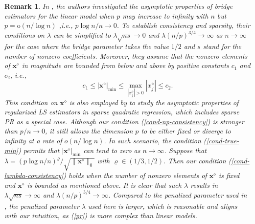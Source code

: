 \documentclass{article}
\newtheorem{remark}{Remark}
\numberwithin{equation}{section}
\begin{document}
\begin{remark}\label{explanation-con-lambda}  In \cite{huang2008asymptotic}, the authors investigated the asymptotic properties of bridge estimators for the linear model when
$p$ may increase to infinity with $n$ but $p=\mathrm{o}(n/\log n)$ ,i.e., $p\log n/n\to0$. To establish consistency and sparsity, their conditions on $\lambda$ can be simplified to $\lambda\sqrt{ns}\to0$ and $\lambda(n/p)^{3/4}\to\infty$ as $n\to\infty$ for the case where the bridge parameter takes the value $1/2$ and $s$ stand for the number of nonzero coefficients.
Moreover, they assume that the nonzero elements of $\mathbf{x}^\diamond$ in magnitude are bounded from below and above by positive constants $c_1$ and $c_2$, i.e.,
\begin{equation}\label{cond-mintrue2}
c_1\leq	|\mathbf{x}^\diamond|_{\mathrm{min}} \leq\max_{|x_j^\diamond|>0}|x_j^\diamond|\leq c_2.\nonumber
\end{equation}
This condition on $\mathbf{x}^\diamond$ is also employed  by \cite{fan2018variable} to study the asymptotic properties of regularized LS estimators in sparse quadratic regression, which includes sparse PR as a special case. Although our condition (\ref{cond-np-consistency}) is stronger than  $p/n\to0$, it still allows the dimension $p$  to be either fixed or diverge to infinity at a rate of $o(n/\log n)$. In such scenario, the condition (\ref{cond-true-min}) permits that $|\mathbf{x}^\diamond|_{\mathrm{min}}$ can tend to zero as $n\to \infty$. Suppose that $\lambda=(p\log n/n)^\varrho/\sqrt{\|\mathbf{x}^\diamond\|_0}$ with $\varrho\in(1/3, 1/2)$. Then our condition (\ref{cond-lambda-consistency}) holds when  the number of nonzero elements of $\mathbf{x}^\diamond$  is fixed and $\mathbf{x}^\diamond$ is bounded as mentioned above. It is clear that such $\lambda$ results in $\lambda\sqrt{ns}\to\infty$ and $\lambda(n/p)^{3/4}\to\infty$. Compared to the penalized parameter used in \cite{huang2008asymptotic},  the penalized parameter $\lambda$ used here is larger, which is reasonable and aligns with our intuition, as (\ref{pr}) is more complex than linear models.\end{remark}
\end{document}
